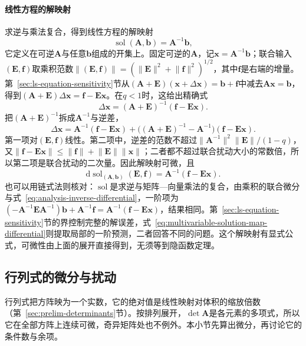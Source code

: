 \paragraph{线性方程的解映射}
求逆与乘法复合，得到线性方程的解映射
\[
 \operatorname{sol}(\bm A,\bm b)=\bm A^{-1}\bm b ,
\]
它定义在可逆$\bm A$与任意$\bm b$组成的开集上。固定可逆的$\bm A$，记$\bm x=\bm A^{-1}\bm b$；联合输入$(\bm E,\bm f)$取乘积范数$\lVert(\bm E,\bm f)\rVert=(\lVert\bm E\rVert^2+\lVert\bm f\rVert^2)^{1/2}$，其中$\bm f$是右端的增量。第~\ref{sec:ls-equation-sensitivity}节从$(\bm A+\bm E)(\bm x+\Delta\bm x)=\bm b+\bm f$中减去$\bm A\bm x=\bm b$，得到$(\bm A+\bm E)\Delta\bm x=\bm f-\bm E\bm x$。在$q<1$时，这给出精确式
\[
 \Delta\bm x=(\bm A+\bm E)^{-1}(\bm f-\bm E\bm x).
\]
把$(\bm A+\bm E)^{-1}$拆成$\bm A^{-1}$与逆差，
\[
 \Delta\bm x=\bm A^{-1}(\bm f-\bm E\bm x)+\bigl((\bm A+\bm E)^{-1}-\bm A^{-1}\bigr)(\bm f-\bm E\bm x).
\]
第一项对$(\bm E,\bm f)$线性。第二项中，逆差的范数不超过$\lVert\bm A^{-1}\rVert^2\lVert\bm E\rVert/(1-q)$，又$\lVert\bm f-\bm E\bm x\rVert\leq\lVert\bm f\rVert+\lVert\bm E\rVert\lVert\bm x\rVert$；二者都不超过联合扰动大小的常数倍，所以第二项是联合扰动的二次量。因此解映射可微，且
\begin{equation}
 \mathrm d\operatorname{sol}_{(\bm A,\bm b)}(\bm E,\bm f)=\bm A^{-1}(\bm f-\bm E\bm x).
\label{eq:multivariable-solution-map-differential}
\end{equation}
也可以用链式法则核对：$\operatorname{sol}$是求逆与矩阵—向量乘法的复合，由乘积的联合微分与式~\eqref{eq:analysis-inverse-differential}，一阶项为$(-\bm A^{-1}\bm E\bm A^{-1})\bm b+\bm A^{-1}\bm f=\bm A^{-1}(\bm f-\bm E\bm x)$，结果相同。第~\ref{sec:ls-equation-sensitivity}节的界控制完整的解误差，式~\eqref{eq:multivariable-solution-map-differential}则提取局部的一阶预测，二者回答不同的问题。这个解映射有显式公式，可微性由上面的展开直接得到，无须等到隐函数定理。

\subsection{行列式的微分与扰动}
\label{sec:multivariable-determinant-differential}

行列式把方阵映为一个实数，它的绝对值是线性映射对体积的缩放倍数（第~\ref{sec:prelim-determinants}节）。按排列展开，$\det\bm A$是各元素的多项式，所以它在全部方阵上连续可微，奇异矩阵处也不例外。本小节先算出微分，再讨论它的条件数与余项。

